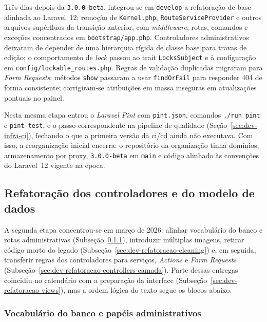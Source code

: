Três dias depois da \texttt{3.0.0-beta}, integrou-se em \texttt{develop} a refatoração de base alinhada ao Laravel~12: remoção de \texttt{Kernel.php}, \texttt{RouteServiceProvider} e outros arquivos supérfluos da transição anterior, com \textit{middleware}, rotas, comandos e exceções concentrados em \texttt{bootstrap/app.php}. Controladores administrativos deixaram de depender de uma hierarquia rígida de classe base para travas de edição; o comportamento de \textit{lock} passou ao trait \texttt{LocksSubject} e à configuração em \texttt{config/lockable\_routes.php}. Regras de validação duplicadas migraram para \textit{Form Requests}; métodos \texttt{show} passaram a usar \texttt{findOrFail} para responder 404 de forma consistente; corrigiram-se atribuições em massa inseguras em atualizações pontuais no painel.

Nesta mesma etapa entrou o \textit{Laravel Pint} com \texttt{pint.json}, comandos \texttt{./run pint} e \texttt{pint-test}, e o passo correspondente na pipeline de qualidade (Seção~\ref{sec:dev-infra-ci}), fechando o que a primeira versão da \acrfull{ci/cd} ainda não executava. Com isso, a reorganização inicial encerra: o repositório da organização tinha domínios, armazenamento por proxy, \texttt{3.0.0-beta} em \texttt{main} e código alinhado às convenções do Laravel~12 vigente na época.


\subsection{Refatoração dos controladores e do modelo de dados}\label{sec:dev-refatoracao-controllers}

A segunda etapa concentrou-se em março de 2026: alinhar vocabulário do banco e rotas administrativas (Subseção~\ref{sec:dev-refatoracao-vocabulario}), introduzir múltiplas imagens, retirar código morto do legado (Subseção~\ref{sec:dev-refatoracao-cleaning}) e, em seguida, transferir regras dos controladores para serviços, \textit{Actions} e \textit{Form Requests} (Subseção~\ref{sec:dev-refatoracao-controllers-camada}). Parte dessas entregas coincidiu no calendário com a preparação da interface (Subseção~\ref{sec:dev-refatoracao-views}), mas a ordem lógica do texto segue os blocos abaixo.


\subsubsection{Vocabulário do banco e papéis administrativos}\label{sec:dev-refatoracao-vocabulario}

